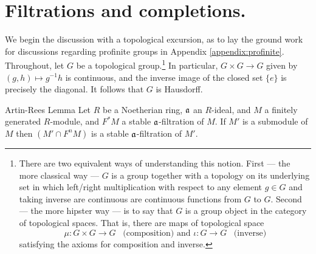 \section{Filtrations and completions.}

We begin the discussion with a topological excursion, as to lay
the ground work for discussions regarding profinite groups in
Appendix \ref{appendix:profinite}. Throughout, let $G$ be a
topological group.\footnote{There are two equivalent ways of 
understanding this notion. First --- the more classical way --- 
$G$ is a group together with a topology on its underlying set in 
which left/right multiplication with respect to any element $g 
\in G$ and taking inverse are continuous are continuous functions 
from $G$ to $G$. Second --- the more hipster way --- is to say 
that $G$ is a group object in the category of topological spaces. 
That is, there are maps of topological space
\[
\mu: G \times G \to G\;\;\;\textrm{(composition) and   }
\iota: G \to G\;\;\;\textrm{(inverse)}
\]
satisfying the axioms for composition and inverse.} In particular,
$G \times G \to G$ given by $(g, h) \mapsto g^{-1}h$ is 
continuous, and the inverse image of the closed set $\{e\}$ is 
precisely the diagonal. It follows that $G$ is Hausdorff.

\begin{defn}

\end{defn}

\begin{thm}{Artin-Rees Lemma}\label{thm:artin_rees_lemma}
Let $R$ be a Noetherian ring, $\mathfrak{a}$ an $R$-ideal, and $M$ a
finitely generated $R$-module, and $F^*M$ a stable 
$\mathfrak{a}$-filtration of $M$. If $M'$ is a submodule of $M$ then
$(M' \cap F^nM)$ is a stable $\mathfrak{a}$-filtration of $M'$.
\end{thm}
